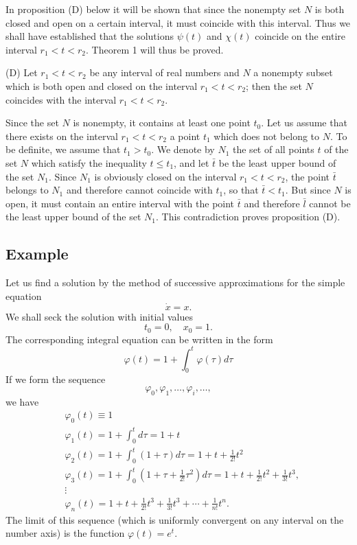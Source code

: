 \documentclass[10pt,a5paper]{book}
\makeatletter
\theoremstyle{plain}
\theoremstyle{definition}
\theoremstyle{remark}
\renewenvironment{proof}[1][\proofname]{\par
  \pushQED{\qed}%
  \normalfont\topsep6\p@\@plus6\p@\relax
  \trivlist
  \item\relax{\itshape #1\@addpunct{.}}\hspace\labelsep\ignorespaces
}{\popQED\endtrivlist\@endpefalse}
\makeatother
\begin{document}
\begin{proof}[Proof of Theorem 1]
In proposition (D) below it will be shown that since the nonempty set $N$ is both closed and open on a certain interval, it must coincide with this interval. Thus we shall have established that the solutions $\psi(t)$ and $\chi(t)$ coincide on the entire interval $r_{1}<t<r_{2}$. Theorem 1 will thus be proved.

(D) Let $r_{1}<t<r_{2}$ be any interval of real numbers and $N$ a nonempty subset which is both open and closed on the interval $r_{1}<t<r_{2}$; then the set $N$ coincides with the interval $r_{1}<t<r_{2}$.

Since the set $N$ is nonempty, it contains at least one point $t_{0}$. Let us assume that there exists on the interval $r_{1}<t<r_{2}$ a point $t_{1}$ which does not belong to $N$. To be definite, we assume that $t_{1}>t_{0}$. We denote by $N_{1}$ the set of all points $t$ of the set $N$ which satisfy the inequality $t \leq t_{1}$, and let $\bar{t}$ be the least upper bound of the set $N_{1}$. Since $N_{1}$ is obviously closed on the interval $r_{1}<t<r_{2}$, the point $\bar{t}$ belongs to $N_{1}$ and therefore cannot coincide with $t_{1}$, so that $\bar{t}<t_{1}$. But since $N$ is open, it must contain an entire interval with the point $\bar{t}$ and therefore $\bar{l}$ cannot be the least upper bound of the set $N_{1}$. This contradiction proves proposition (D).
\end{proof}

\subsection*{Example}
Let us find a solution by the method of successive approximations for the simple equation
\[
\dot{x}=x .
\]
We shall seck the solution with initial values
\[
t_{0}=0, \quad x_{0}=1 .
\]
The corresponding integral equation can be written in the form
\[
\varphi(t)=1+\int_{0}^{t} \varphi(\tau) d \tau
\]
If we form the sequence
\[
\varphi_{0}, \varphi_{1}, \ldots, \varphi_{i}, \ldots,
\]
we have
\[
\begin{aligned}
& \varphi_{0}(t) \equiv 1 \\
& \varphi_{1}(t)=1+\int_{0}^{t} d \tau=1+t \\
& \varphi_{2}(t)=1+\int_{0}^{t}(1+\tau) d \tau=1+t+\frac{1}{2!} t^{2} \\
& \varphi_{3}(t)=1+\int_{0}^{t}\left(1+\tau+\frac{1}{2!} \tau^{2}\right) d \tau=1+t+\frac{1}{2!} t^{2}+\frac{1}{3!} t^{3}, \\
& \vdots \\
& \varphi_{n}(t)=1+t+\frac{1}{2!} t^{3}+\frac{1}{3!} t^{3}+\cdots+\frac{1}{n!} t^{n} .
\end{aligned}
\]
The limit of this sequence (which is uniformly convergent on any interval on the number axis) is the function $\varphi(t)=e^{t}$.
\end{document}
